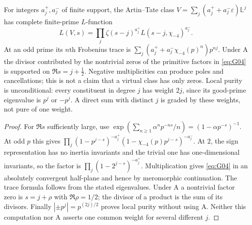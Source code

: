 \begin{proposition}
\label{AC-G04}
For integers $a_j^+,a_j^-$ of finite support, the Artin--Tate class
$V=\sum_j(a_j^++a_j^-\varepsilon)\mathbb L^j$ has complete finite-prime
$L$-function
\begin{equation}\label{eq:G04}
 L(V,s)=\prod_j\zeta(s-j)^{a_j^+}L(s-j,\chi_{-4})^{a_j^-}.
\end{equation}
At an odd prime its $n$th Frobenius trace is
$\sum_j(a_j^++a_j^-\chi_{-4}(p)^n)p^{nj}$.
Under A the divisor contributed by the nontrivial zeros of the primitive
factors in \eqref{eq:G04} is supported on
$\Re s=j+\tfrac12$.  Negative multiplicities can produce poles and
cancellations; this is not a claim that a virtual class has only zeros.
Local purity is unconditional: every constituent in degree $j$ has
weight $2j$, since its good-prime eigenvalue is $p^j$ or $-p^j$.
A direct sum with distinct $j$ is graded by these weights, not pure of
one weight.
\end{proposition}
\begin{proof}
For $\Re s$ sufficiently large, use
$\exp(\sum_{n\geq1}\alpha^n p^{-ns}/n)=(1-\alpha p^{-s})^{-1}$.
At odd $p$ this gives
$\prod_j(1-p^{j-s})^{-a_j^+}
(1-\chi_{-4}(p)p^{j-s})^{-a_j^-}$.
At $2$, the sign representation has no inertia invariants and the
trivial one has one-dimensional invariants, so the factor is
$\prod_j(1-2^{j-s})^{-a_j^+}$.
Multiplication gives \eqref{eq:G04} in an absolutely convergent half-plane
and hence by meromorphic continuation.  The trace formula follows from
the stated eigenvalues.  Under A a nontrivial factor zero is
$s=j+\rho$ with $\Re\rho=1/2$; the divisor of a product is the sum of
its divisors.  Finally $|\pm p^j|=p^{(2j)/2}$ proves local purity without
using A.  Neither this computation nor A asserts one common weight for
several different $j$.
\end{proof}

